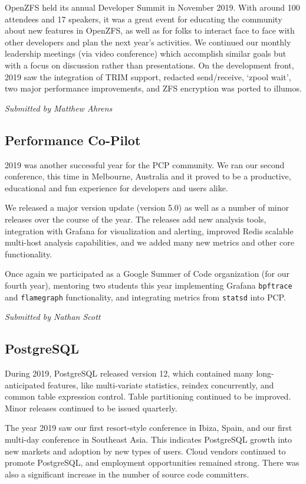 \documentclass[a4paper]{report}
\begin{document}
OpenZFS held its annual Developer Summit in November 2019. With around
100 attendees and 17 speakers, it was a great event for educating the
community about new features in OpenZFS, as well as for folks to
interact face to face with other developers and plan the next year's
activities. We continued our monthly leadership meetings (via video
conference) which accomplish similar goals but with a focus on
discussion rather than presentations. On the development front, 2019 saw
the integration of TRIM support, redacted send/receive, `zpool wait',
two major performance improvements, and ZFS encryption was ported to
illumos.

{\em Submitted by Matthew Ahrens}

\subsection{Performance Co-Pilot}

2019 was another successful year for the PCP community.  We ran our
second conference, this time in Melbourne, Australia and it proved to be
a productive, educational and fun experience for developers and users
alike.

We released a major version update (version 5.0) as well as a number of
minor releases over the course of the year.  The releases add new
analysis tools, integration with Grafana for visualization and alerting,
improved Redis scalable multi-host analysis capabilities, and we added
many new metrics and other core functionality.

Once again we participated as a Google Summer of Code organization (for
our fourth year), mentoring two students this year implementing Grafana
\texttt{bpftrace} and \texttt{flamegraph} functionality, and integrating
metrics from \texttt{statsd} into PCP.

{\em Submitted by Nathan Scott}

\subsection{PostgreSQL}

During 2019, PostgreSQL released version 12, which contained many
long-anticipated features, like multi-variate statistics, reindex
concurrently, and common table expression control.  Table partitioning
continued to be improved.  Minor releases continued to be issued
quarterly.

The year 2019 saw our first resort-style conference in Ibiza, Spain, and
our first multi-day conference in Southeast Asia.  This indicates
PostgreSQL growth into new markets and adoption by new types of users.
Cloud vendors continued to promote PostgreSQL, and employment
opportunities remained strong.  There was also a significant increase in
the number of source code committers.
\end{document}
